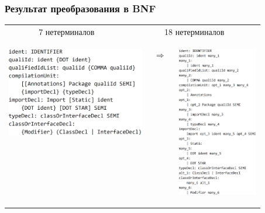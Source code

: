 \documentclass{beamer}
\begin{document}
	\begin{frame}
		\frametitle{Результат преобразования в BNF}
		\begin{tabular}{c c}
		7 нетерминалов & 18 нетерминалов
		\\
		\multicolumn{2}{c}{
		\begin{columns}
			\begin{column}{6.1cm}
				\includegraphics[width=6cm]{pictures/java_before.png}
			\end{column}
			\begin{column}{.7cm}
				$ \Longrightarrow $
			\end{column}
			\begin{column}{5cm}
				\includegraphics[width=3.5cm]{pictures/java_after.png}
			\end{column}
	    \end{columns}
    }
        \end{tabular}
	\end{frame}
\end{document}
